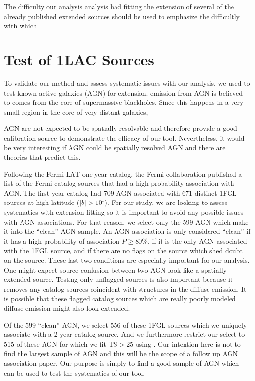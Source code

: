 \documentclass[preprint]{aastex}
\newcommand{\gev}{\text{GeV}\xspace}
\newcommand{\ts}{\text{TS}\xspace}
\renewcommand{\deg}{\ensuremath{^\circ}\xspace}
\newcommand{\pointlike}{\text{\em pointlike}\xspace}
\begin{document}
The difficulty our analysis analysis had fitting the extension of several
of the already published extended sources should be used to emphasize
the difficultly with which

\section{Test of 1LAC Sources}

To validate our method and assess systematic issues with our
analysis, we used \pointlike to test known active galaxies (AGN) for extension.
\gev emission from AGN is believed to comes from the
core of supermassive blackholes. Since this happens in a very small region
in the core of very distant galaxies,

AGN are not expected to be spatially resolvable and therefore
provide a good calibration source to demonstrate the efficacy of our
tool. Nevertheless, it would be very interesting if AGN could be
spatially resolved AGN and there are theories that predict
this\cite{pair_halo_paper, http://adsabs.harvard.edu/doi/10.1086/187222}.

Following the Fermi-LAT one year catalog, the Fermi collaboration
published a list of the Fermi catalog sources that had a high probability
association with AGN. The first year catalog had 709 AGN associated with
671 distinct 1FGL sources at high latitude ($|b|>10\deg$).  For our
study, we are looking to assess systematics with extension fitting so
it is important to avoid any possible issues with AGN associations.
For that reason, we select only the 599 AGN which make it into the
``clean'' AGN sample. An AGN association is only considered ``clean''
if it has a high probability of association $P\ge 80\%$, if it is the
only AGN associated with the 1FGL source, and if there are no flags
on the source which shed doubt on the source\cite{1FGL}. These last two
conditions are especially important for our analysis. One might expect
source confusion between two AGN look like a spatially extended source.
Testing only unflagged sources is also important because it removes
any catalog sources coincident with structures in the diffuse emission.
It is possible that these flagged catalog sources which are really poorly
modeled diffuse emission might also look extended.

Of the 599 ``clean'' AGN, we select 556 of these 1FGL sources which
we uniquely associate with a 2 year catalog source. And we furthermore
restrict our select to 515 of these AGN for which we fit $\ts>25$ using
\pointlike.  Our intention here is not to find the largest sample of
AGN and this will be the scope of a follow up AGN association paper. Our
purpose is simply to find a good sample of AGN which can be used to
test the systematics of our tool.
\end{document}
